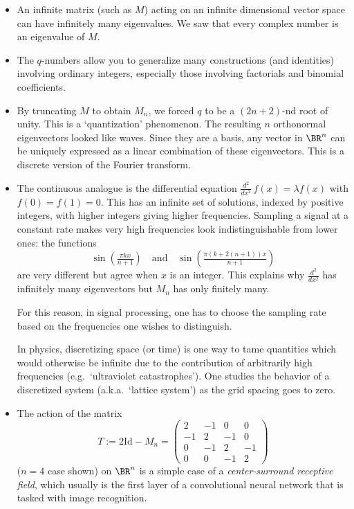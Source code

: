 \documentclass[10pt]{amsart}
\theoremstyle{mythm}
\theoremstyle{definition}
\theoremstyle{myrmk}
\begin{document}
	\begin{itemize}
		\item An infinite matrix (such as $M$) acting on an infinite dimensional vector space can have infinitely many eigenvalues. We saw that every complex number is an eigenvalue of $M$. 
		\item The $q$-numbers allow you to generalize many constructions (and identities) involving ordinary integers, especially those involving factorials and binomial coefficients. 
		\item By truncating $M$ to obtain $M_n$, we forced $q$ to be a $(2n+2)$-nd root of unity. This is a `quantization' phenomenon. The resulting $n$ orthonormal eigenvectors looked like waves. Since they are a basis, any vector in $\BR^n$ can be uniquely expressed as a linear combination of these eigenvectors. This is a discrete version of the Fourier transform. 
		\item The continuous analogue is the differential equation $\frac{d^2}{dx^2} \, f(x) = \lambda f(x)$ with $f(0) = f(1) = 0$. This has an infinite set of solutions, indexed by positive integers, with higher integers giving higher frequencies. Sampling a signal at a constant rate makes very high frequencies look indistinguishable from lower ones: the functions 
		\[
			\sin(\tfrac{\pi k x}{n+1}) \quad \text{and} \quad \sin(\tfrac{\pi (k + 2(n+1)) x}{n+1}) 
		\]
		are very different but agree when $x$ is an integer. This explains why $\frac{d^2}{dx^2}$ has infinitely many eigenvectors but $M_n$ has only finitely many. 
		
		For this reason, in signal processing, one has to choose the sampling rate based on the frequencies one wishes to distinguish. 
		
		In physics, discretizing space (or time) is one way to tame quantities which would otherwise be infinite due to the contribution of arbitrarily high frequencies (e.g.\ `ultraviolet catastrophes'). One studies the behavior of a discretized system (a.k.a.\ `lattice system') as the grid spacing goes to zero. 
		\item The action of the matrix 
		\[
			T := 2 \mathrm{Id} - M_n = \begin{pmatrix}
			2 & -1 & 0 & 0 \\
			-1 & 2 & -1 & 0 \\
			0 & -1 & 2 & -1 \\
			0 & 0 & -1 & 2 
			\end{pmatrix}
		\]
		($n = 4$ case shown) on $\BR^n$ is a simple case of a \emph{center-surround receptive field}, which usually is the first layer of a convolutional neural network that is tasked with image recognition. 
		

\end{itemize}
\end{document}
